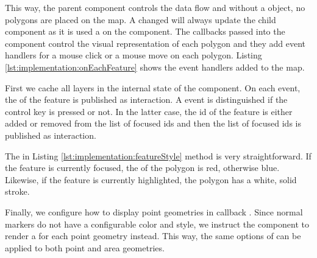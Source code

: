 This way, the parent  component controls the data flow and without a  object, no polygons are placed on the map.
A changed  will always update the child component as it is used a  on the  component.
The callbacks passed into the  component control the visual representation of each polygon and they add event handlers for a mouse click or a mouse move on each polygon.
Listing \ref{lst:implementation:onEachFeature} shows the event handlers added to the map.



First we cache all layers in the internal state of the  component.
On each  event, the  of the feature is published as  interaction.
A  event is distinguished if the control key is pressed or not.
In the latter case, the id of the feature is either added or removed from the list of focused ids and then the list of focused ids is published as  interaction.



The  in Listing \ref{lst:implementation:featureStyle} method is very straightforward.
If the feature is currently focused, the  of the polygon is red, otherwise blue.
Likewise, if the feature is currently highlighted, the polygon has a white, solid stroke.



Finally, we configure how to display point geometries in callback .
Since normal markers do not have a configurable color and style, we instruct the  component to render a  for each point geometry instead.
This way, the same options of  can be applied to both point and area geometries.





